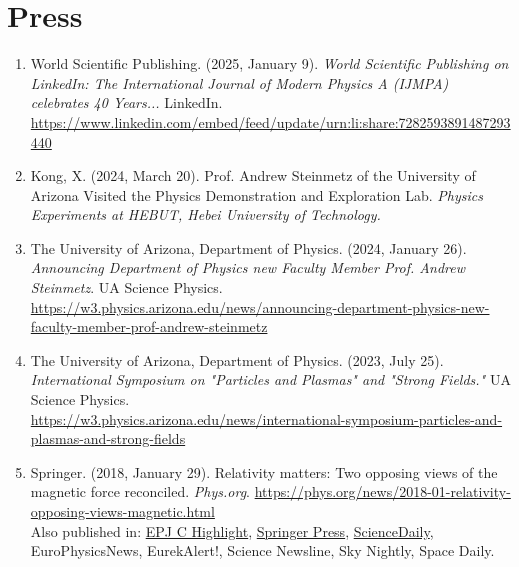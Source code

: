 \documentclass[11pt]{article}
\begin{document}
\section*{Press}
\begin{enumerate}[leftmargin=*,nosep]
    \item World Scientific Publishing. (2025, January 9). \textit{World Scientific Publishing on LinkedIn: The International Journal of Modern Physics A (IJMPA) celebrates 40 Years...} LinkedIn. \\ \href{https://www.linkedin.com/embed/feed/update/urn:li:share:7282593891487293440}{https://www.linkedin.com/embed/feed/update/urn:li:share:7282593891487293440}
    \item Kong, X. (2024, March 20). Prof. Andrew Steinmetz of the University of Arizona Visited the Physics Demonstration and Exploration Lab. \textit{Physics Experiments at HEBUT, Hebei University of Technology.}
    \item The University of Arizona, Department of Physics. (2024, January 26). \textit{Announcing Department of Physics new Faculty Member Prof. Andrew Steinmetz}. UA Science Physics. \\ {\footnotesize\href{https://w3.physics.arizona.edu/news/announcing-department-physics-new-faculty-member-prof-andrew-steinmetz}{https://w3.physics.arizona.edu/news/announcing-department-physics-new-faculty-member-prof-andrew-steinmetz}}
    \item The University of Arizona, Department of Physics. (2023, July 25). \textit{International Symposium on "Particles and Plasmas" and "Strong Fields."} UA Science Physics. \\ {\footnotesize\href{https://w3.physics.arizona.edu/news/international-symposium-particles-and-plasmas-and-strong-fields}{https://w3.physics.arizona.edu/news/international-symposium-particles-and-plasmas-and-strong-fields}}
    \item Springer. (2018, January 29). Relativity matters: Two opposing views of the magnetic force reconciled. \textit{Phys.org}. \href{https://phys.org/news/2018-01-relativity-opposing-views-magnetic.html}{https://phys.org/news/2018-01-relativity-opposing-views-magnetic.html}\\[0.3em]
    Also published in: \href{https://www.epj.org/epjc-news/1422-epjc-highlight-relativity-matters-two-opposing-views-of-the-magnetic-force-reconciled}{EPJ C Highlight}, \href{https://www.springer.com/gp/about-springer/media/research-news/all-english-research-news/relativity-matters--two-opposing-views-of-the-magnetic-force-reconciled/15417658}{Springer Press}, \href{https://www.sciencedaily.com/releases/2018/01/180129131327.htm}{ScienceDaily}, EuroPhysicsNews, EurekAlert!, Science Newsline, Sky Nightly, Space Daily.
\end{enumerate}
\end{document}
